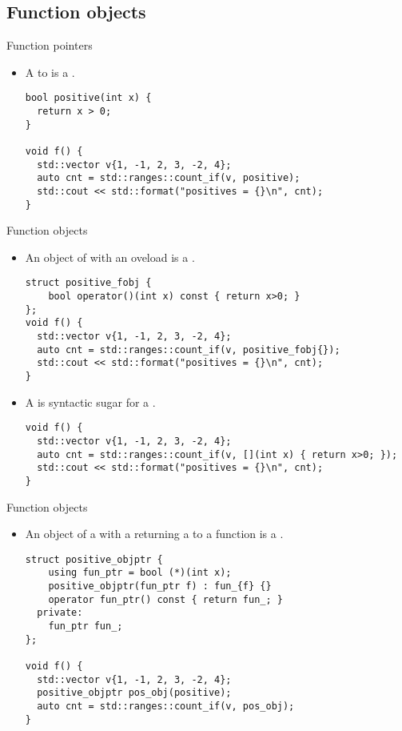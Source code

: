 \subsection{Function objects}

\begin{frame}[t,fragile]{Function pointers}
\begin{itemize}
   \item A  to  is a .
\begin{lstlisting}
bool positive(int x) { 
  return x > 0; 
}

void f() {
  std::vector v{1, -1, 2, 3, -2, 4};
  auto cnt = std::ranges::count_if(v, positive);
  std::cout << std::format("positives = {}\n", cnt);
}
\end{lstlisting}
\end{itemize}
\end{frame}

\begin{frame}[t,fragile]{Function objects}
\begin{itemize}
  \item An object of  with an  oveload 
        is a .
\begin{lstlisting}
struct positive_fobj {
    bool operator()(int x) const { return x>0; }
};
void f() {
  std::vector v{1, -1, 2, 3, -2, 4};
  auto cnt = std::ranges::count_if(v, positive_fobj{});
  std::cout << std::format("positives = {}\n", cnt);
}
\end{lstlisting}

  \pause
  \item A  is syntactic sugar for a .
\begin{lstlisting}
void f() {
  std::vector v{1, -1, 2, 3, -2, 4};
  auto cnt = std::ranges::count_if(v, [](int x) { return x>0; });
  std::cout << std::format("positives = {}\n", cnt);
}
\end{lstlisting}

\end{itemize}
\end{frame}

\begin{frame}[t,fragile]{Function objects}
\begin{itemize}
  \item An object of a  with a 
         returning a 
        to a function 
        is a .
\begin{lstlisting}
struct positive_objptr {
    using fun_ptr = bool (*)(int x);
    positive_objptr(fun_ptr f) : fun_{f} {}
    operator fun_ptr() const { return fun_; }
  private:
    fun_ptr fun_;
};

void f() {
  std::vector v{1, -1, 2, 3, -2, 4};
  positive_objptr pos_obj(positive);
  auto cnt = std::ranges::count_if(v, pos_obj);
}
\end{lstlisting}

\end{itemize}
\end{frame}
